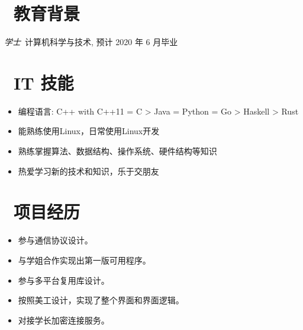 \documentclass{resume}
\begin{document}


 
\section{\faGraduationCap\  教育背景}
\textit{学士}\ 计算机科学与技术, 预计 2020 年 6 月毕业

\section{\faCogs\ IT 技能}
\begin{itemize}[parsep=0.5ex]
  \item 编程语言: C++ with C++11 = C > Java = Python = Go > Haskell > Rust
  \item 能熟练使用Linux，日常使用Linux开发
  \item 熟练掌握算法、数据结构、操作系统、硬件结构等知识
  \item 热爱学习新的技术和知识，乐于交朋友
\end{itemize}

\section{\faUsers\ 项目经历}
\begin{itemize}
  \item 参与通信协议设计。
  \item 与学姐合作实现出第一版可用程序。
  \item 参与多平台复用库设计。
\end{itemize}

\begin{itemize}
  \item 按照美工设计，实现了整个界面和界面逻辑。
  \item 对接学长加密连接服务。
\end{itemize}
\end{document}
